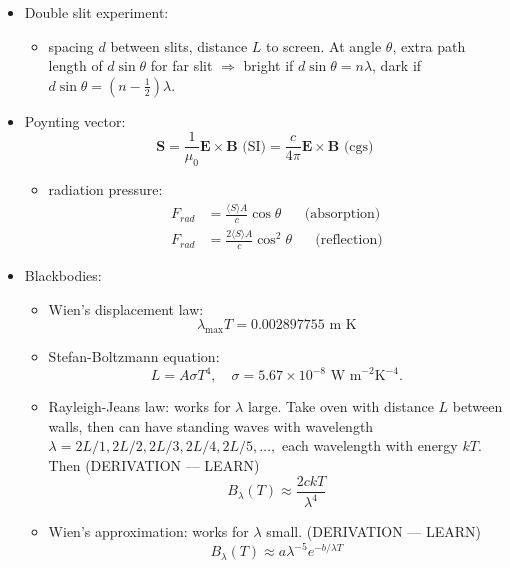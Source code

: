 \documentclass[12pt]{article}
\begin{document}
\begin{itemize}
\begin{itemize}
\end{itemize}
\item Double slit experiment:
\begin{itemize}
\item spacing $d$ between slits, distance $L$ to screen. At angle $\theta$, extra path length of $d\sin\theta$ for far slit $\Longrightarrow$ bright if $d\sin\theta = n\lambda$, dark if $d\sin\theta = (n - \frac{1}{2})\lambda$.
\end{itemize}
\item Poynting vector:
\begin{equation}
\bm{S} = \frac{1}{\mu_0}\bm{E}\times\bm{B}\text{ (SI)} = \frac{c}{4\pi}\bm{E}\times\bm{B}\text{ (cgs)}
\end{equation}
\begin{itemize}
\item radiation pressure:
\begin{align*}
F_{rad} &= \frac{\langle S\rangle A}{c}\cos\theta\,\,\,\,\,\,\,\,\,\,\text{(absorption)}\\
F_{rad} &= \frac{2\langle S\rangle A}{c}\cos^2\theta\,\,\,\,\,\,\,\,\,\,\text{(reflection)}
\end{align*}
\end{itemize}
\item Blackbodies:
\begin{itemize}
\item Wien's displacement law:
\begin{equation}
\lambda_\text{max} T = 0.002897755\text{ m K}
\end{equation}
\item Stefan-Boltzmann equation:
\begin{equation}
L = A\sigma T^4,\,\,\,\,\,\,\sigma = 5.67\times 10^{-8}\text{ W m}^{-2}\text{K}^{-4}.
\end{equation}
\item Rayleigh-Jeans law: works for $\lambda$ large. Take oven with distance $L$ between walls, then can have standing waves with wavelength $\lambda = 2L/1, 2L/2, 2L/3, 2L/4, 2L/5, \dots,$ each wavelength with energy $kT$. Then (DERIVATION --- LEARN)
\begin{equation}
B_\lambda(T)\approx\frac{2ckT}{\lambda^4}
\end{equation}
\item Wien's approximation: works for $\lambda$ small. (DERIVATION --- LEARN)
\begin{equation}
B_\lambda(T) \approx a \lambda^{-5} e^{-b/\lambda T}
\end{equation}

\end{itemize}
\end{itemize}
\end{document}
